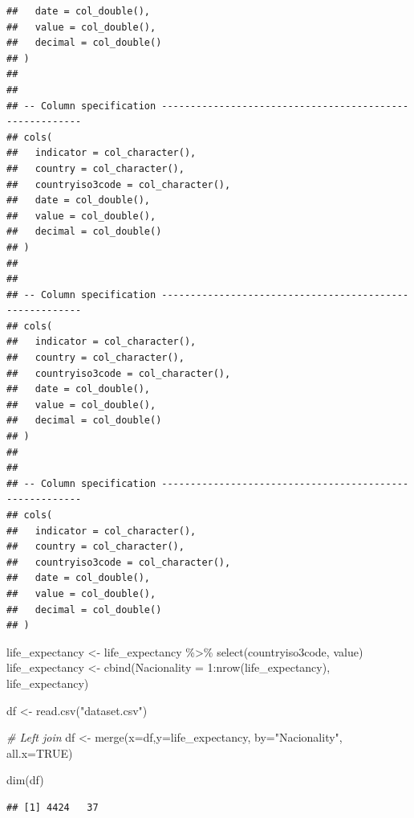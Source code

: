 \documentclass[
]{article}
\newenvironment{Shaded}{\begin{snugshade}}{\end{snugshade}}
\newcommand{\AttributeTok}[1]{\textcolor[rgb]{0.77,0.63,0.00}{#1}}
\newcommand{\CommentTok}[1]{\textcolor[rgb]{0.56,0.35,0.01}{\textit{#1}}}
\newcommand{\ConstantTok}[1]{\textcolor[rgb]{0.00,0.00,0.00}{#1}}
\newcommand{\DecValTok}[1]{\textcolor[rgb]{0.00,0.00,0.81}{#1}}
\newcommand{\FunctionTok}[1]{\textcolor[rgb]{0.00,0.00,0.00}{#1}}
\newcommand{\NormalTok}[1]{#1}
\newcommand{\OtherTok}[1]{\textcolor[rgb]{0.56,0.35,0.01}{#1}}
\newcommand{\SpecialCharTok}[1]{\textcolor[rgb]{0.00,0.00,0.00}{#1}}
\newcommand{\StringTok}[1]{\textcolor[rgb]{0.31,0.60,0.02}{#1}}
\begin{document}
\begin{verbatim}
##   date = col_double(),
##   value = col_double(),
##   decimal = col_double()
## )
## 
## 
## -- Column specification --------------------------------------------------------
## cols(
##   indicator = col_character(),
##   country = col_character(),
##   countryiso3code = col_character(),
##   date = col_double(),
##   value = col_double(),
##   decimal = col_double()
## )
## 
## 
## -- Column specification --------------------------------------------------------
## cols(
##   indicator = col_character(),
##   country = col_character(),
##   countryiso3code = col_character(),
##   date = col_double(),
##   value = col_double(),
##   decimal = col_double()
## )
## 
## 
## -- Column specification --------------------------------------------------------
## cols(
##   indicator = col_character(),
##   country = col_character(),
##   countryiso3code = col_character(),
##   date = col_double(),
##   value = col_double(),
##   decimal = col_double()
## )
\end{verbatim}

\begin{Shaded}
\begin{Highlighting}[]
\NormalTok{life\_expectancy }\OtherTok{\textless{}{-}}\NormalTok{ life\_expectancy }\SpecialCharTok{\%\textgreater{}\%} \FunctionTok{select}\NormalTok{(countryiso3code, value)}
\NormalTok{life\_expectancy }\OtherTok{\textless{}{-}} \FunctionTok{cbind}\NormalTok{(}\AttributeTok{Nacionality =} \DecValTok{1}\SpecialCharTok{:}\FunctionTok{nrow}\NormalTok{(life\_expectancy), life\_expectancy)}

\NormalTok{df }\OtherTok{\textless{}{-}} \FunctionTok{read.csv}\NormalTok{(}\StringTok{"dataset.csv"}\NormalTok{)}

\CommentTok{\# Left join}
\NormalTok{df }\OtherTok{\textless{}{-}} \FunctionTok{merge}\NormalTok{(}\AttributeTok{x=}\NormalTok{df,}\AttributeTok{y=}\NormalTok{life\_expectancy, }
             \AttributeTok{by=}\StringTok{"Nacionality"}\NormalTok{, }\AttributeTok{all.x=}\ConstantTok{TRUE}\NormalTok{)}
\end{Highlighting}
\end{Shaded}

\begin{Shaded}
\begin{Highlighting}[]
\FunctionTok{dim}\NormalTok{(df)}
\end{Highlighting}
\end{Shaded}

\begin{verbatim}
## [1] 4424   37
\end{verbatim}
\end{document}
